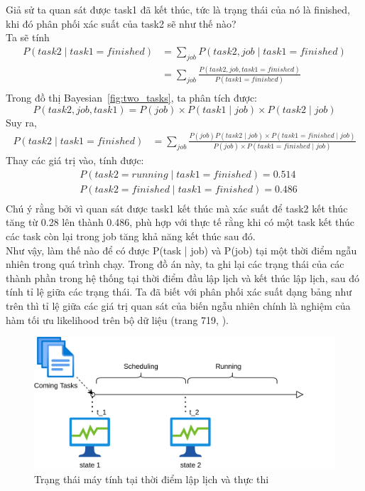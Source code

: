 \documentclass{my_style}
\begin{document}
\noindent
Giả sử ta quan sát được task1 đã kết thúc, tức là trạng thái của nó là finished, khi đó phân phối xác suất của task2 sẽ như thế nào?\\
 Ta sẽ tính 
\begin{align*}
	P(task2 \mid task1 = finished) &= \sum_{job}P(task2, job \mid task1 = finished) \\
									&= \sum_{job}\frac{P(task2, job, task1 = finished)}{P(task1 = finished)} \\
\end{align*}
Trong đồ thị Bayesian~\ref{fig:two_tasks}, ta phân tích được: 
\[
	P(task2, job, task1) = P(job) \times P(task1 \mid job) \times P(task2 \mid job)
\]
Suy ra, 
\begin{align*}
	P(task2 \mid task1 = finished) &= \sum_{job}\frac{P(job)P(task2 \mid job) \times P(task1 = finished \mid job)}{P(job) \times P(task1 = finished \mid job)}
\end{align*}
Thay các giá trị vào, tính được: 
\begin{align*}
	&P(task2 = running \mid task1 = finished) = 0.514 \\
	&P(task2 = finished \mid task1 = finished) = 0.486 \\
\end{align*}
Chú ý rằng bởi vì quan sát được task1 kết thúc mà xác suất để task2 kết thúc tăng từ 0.28 lên thành 0.486, phù hợp với thực tế rằng khi có một task kết thúc các task còn lại trong job tăng khả năng kết thúc sau đó. \\
Như vậy, làm thế nào để có được P(task | job) và P(job) tại một thời điểm ngẫu nhiên trong quá trình chạy. Trong đồ án này, ta ghi lại các trạng thái của các thành phần trong hệ thống tại thời điểm đầu lập lịch và kết thúc lập lịch, sau đó tính tỉ lệ giữa các trạng thái. Ta đã biết với phân phối xác suất dạng bảng như trên thì tỉ lệ giữa các giá trị quan sát của biến ngẫu nhiên chính là nghiệm của hàm tối ưu likelihood trên bộ dữ liệu (trang 719, \cite{28}). \\
\begin{figure}[h!]
	\centering
	\includegraphics[scale=0.8]{images/state_change.png}
	\caption{Trạng thái máy tính tại thời điểm lập lịch và thực thi}
	\label{fig:statechange1}
\end{figure}
\end{document}
